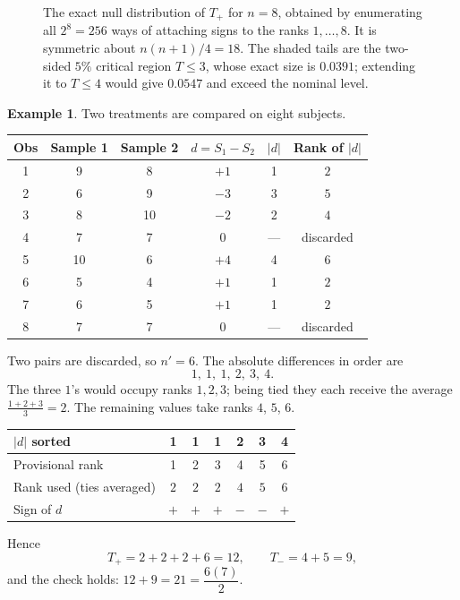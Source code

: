 \documentclass[11pt,a4paper]{article}
\theoremstyle{definition}
\newtheorem{example}[thm]{Example}
\begin{document}
\begin{figure}[H]
\caption{The exact null distribution of $T_{+}$ for $n=8$, obtained by enumerating all $2^{8}=256$ ways of attaching signs to the ranks $1,\dots,8$. It is symmetric about $n(n+1)/4=18$. The shaded tails are the two-sided $5\%$ critical region $T\leq 3$, whose exact size is $0.0391$; extending it to $T\leq 4$ would give $0.0547$ and exceed the nominal level.}
\end{figure}

\begin{example}
Two treatments are compared on eight subjects.

\begin{center}
\begin{tabular}{c|c|c|c|c|c}
Obs & Sample 1 & Sample 2 & $d = S_1-S_2$ & $\left|d\right|$ & Rank of $\left|d\right|$\\
\hline
1 & 9  & 8  & $+1$ & 1 & $2$\\
2 & 6  & 9  & $-3$ & 3 & $5$\\
3 & 8  & 10 & $-2$ & 2 & $4$\\
4 & 7  & 7  & $0$  & --- & discarded\\
5 & 10 & 6  & $+4$ & 4 & $6$\\
6 & 5  & 4  & $+1$ & 1 & $2$\\
7 & 6  & 5  & $+1$ & 1 & $2$\\
8 & 7  & 7  & $0$  & --- & discarded\\
\end{tabular}
\end{center}

Two pairs are discarded, so $n' = 6$. The absolute differences in order are
$$1,\ 1,\ 1,\ 2,\ 3,\ 4 .$$
The three $1$'s would occupy ranks $1, 2, 3$; being tied they each receive the
average $\frac{1+2+3}{3} = 2$. The remaining values take ranks $4$, $5$, $6$.

\begin{center}
\begin{tabular}{l|cccccc}
$\left|d\right|$ sorted & 1 & 1 & 1 & 2 & 3 & 4\\
\hline
Provisional rank & 1 & 2 & 3 & 4 & 5 & 6\\
Rank used (ties averaged) & $2$ & $2$ & $2$ & $4$ & $5$ & $6$\\
Sign of $d$ & $+$ & $+$ & $+$ & $-$ & $-$ & $+$\\
\end{tabular}
\end{center}

Hence
$$T_{+} = 2 + 2 + 2 + 6 = 12,
\qquad
T_{-} = 4 + 5 = 9,$$
and the check holds: $12 + 9 = 21 = \dfrac{6(7)}{2}$.
\end{example}
\end{document}
